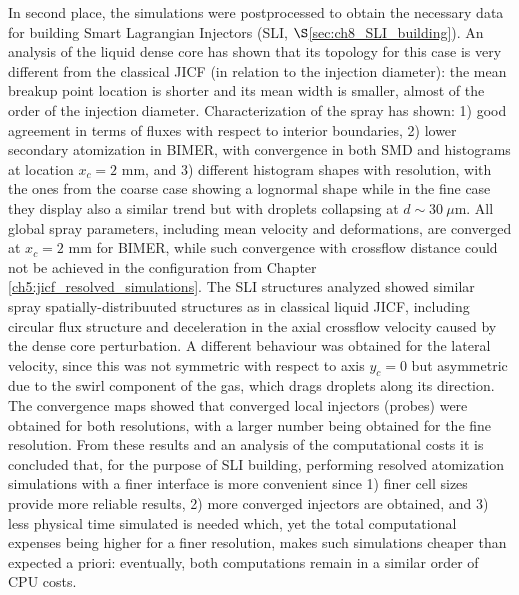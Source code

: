 In second place, the simulations were postprocessed to obtain the necessary data for building Smart Lagrangian Injectors (SLI, $\S$\ref{sec:ch8_SLI_building}). An analysis of the liquid dense core has shown that its topology for this case is very different from the classical JICF (in relation to the injection diameter): the mean breakup point location is shorter and its mean width is smaller, almost of the order of the injection diameter. Characterization of the spray has shown: 1) good agreement in terms of fluxes with respect to interior boundaries, 2) lower secondary atomization in BIMER, with convergence in both SMD and histograms at location $x_c = 2$ mm, and 3) different histogram shapes with resolution, with the ones from the coarse case showing a lognormal shape while in the fine case they display also a similar trend but with droplets collapsing at $d \sim 30~\mu$m. All global spray parameters, including mean velocity and deformations, are converged at $x_c = 2$ mm for BIMER, while such convergence with crossflow distance could not be achieved in the configuration from Chapter \ref{ch5:jicf_resolved_simulations}. The SLI structures analyzed showed similar spray spatially-distribuuted structures as in classical liquid JICF, including circular flux structure and deceleration in the axial crossflow velocity caused by the dense core perturbation. A different behaviour was obtained for the lateral velocity, since this was not symmetric with respect to axis $y_c = 0$ but asymmetric due to the swirl component of the gas, which drags droplets along its direction. The convergence maps showed that converged local injectors (probes) were obtained for both resolutions, with a larger number being obtained for the fine resolution. From these results and an analysis of the computational costs it is concluded that, for the purpose of SLI building, performing resolved atomization simulations with a finer interface is more convenient since 1) finer cell sizes provide more reliable results, 2) more converged injectors are obtained, and 3) less physical time simulated is needed which, yet the total computational expenses being higher for a finer resolution, makes such simulations cheaper than expected a priori: eventually, both computations remain in a similar order of CPU costs.

